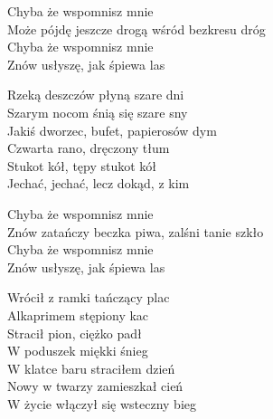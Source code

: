 
\begin{text}
    Chyba że wspomnisz mnie\\
    Może pójdę jeszcze drogą wśród bezkresu dróg\\
    Chyba że wspomnisz mnie\\
    Znów usłyszę, jak śpiewa las

    Rzeką deszczów płyną szare dni\\
    Szarym nocom śnią się szare sny\\
    Jakiś dworzec, bufet, papierosów dym\\
    Czwarta rano, dręczony tłum\\
    Stukot kół, tępy stukot kół\\
    Jechać, jechać, lecz dokąd, z kim

    Chyba że wspomnisz mnie\\
    Znów zatańczy beczka piwa, zalśni tanie szkło\\
    Chyba że wspomnisz mnie\\
    Znów usłyszę, jak śpiewa las

    Wrócił z ramki tańczący plac\\
    Alkaprimem stępiony kac\\
    Stracił pion, ciężko padł\\
    W poduszek miękki śnieg\\
    W klatce baru straciłem dzień\\
    Nowy w twarzy zamieszkał cień\\
    W życie włączył się wsteczny bieg
\end{text}
\begin{chord}

\end{chord}